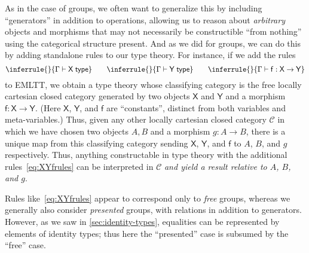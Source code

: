 \documentclass[10pt]{article}
\def\ty{\;\mathsf{type}}
\def\m#1{\llbracket#1\rrbracket}
\def\types{\vdash}
\def\U{\mathscr{U}}
\def\C{\mathscr{C}}
\numberwithin{equation}{section}
\begin{document}
As in the case of groups, we often want to generalize this by including ``generators'' in addition to operations, allowing us to reason about \emph{arbitrary} objects and morphisms that may not necessarily be constructible ``from nothing'' using the categorical structure present.
And as we did for groups, we can do this by adding standalone rules to our type theory.
For instance, if we add the rules
\begin{equation}\label{eq:XYfrules}
  \inferrule{ }{\Gamma\types \mathsf{X}\ty} \qquad
  \inferrule{ }{\Gamma\types \mathsf{Y}\ty} \qquad
  \inferrule{ }{\Gamma\types \mathsf{f}:\mathsf{X}\to \mathsf{Y}}  
\end{equation}
to EMLTT, we obtain a type theory whose classifying category is the free locally cartesian closed category generated by two objects $\mathsf X$ and $\mathsf{Y}$ and a morphism $\mathsf{f}:\mathsf{X}\to \mathsf{Y}$.
(Here $\mathsf{X}$, $\mathsf{Y}$, and $\mathsf{f}$ are ``constants'', distinct from both variables and meta-variables.)
Thus, given any other locally cartesian closed category $\C$ in which we have chosen two objects $A,B$ and a morphism $g:A\to B$, there is a unique map from this classifying category sending $\mathsf{X}$, $\mathsf{Y}$, and $\mathsf{f}$ to $A$, $B$, and $g$ respectively.
Thus, anything constructable in type theory with the additional rules~\eqref{eq:XYfrules} can be interpreted in $\C$ \emph{and yield a result relative to $A$, $B$, and $g$}.

Rules like~\eqref{eq:XYfrules} appear to correspond only to \emph{free} groups, whereas we generally also consider \emph{presented} groups, with relations in addition to generators. %
However, as we saw in \cref{sec:identity-types}, equalities can be represented by elements of identity types; thus here the ``presented'' case is subsumed by the ``free'' case.

\end{document}
